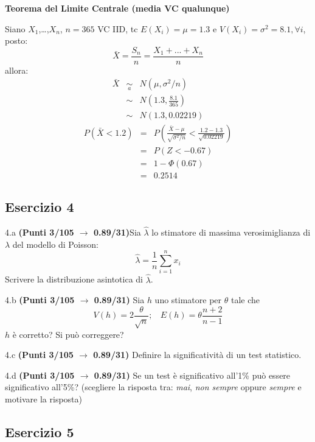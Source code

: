 \documentclass[
  11pt,
]{book}
\theoremstyle{mytheoremstyle}
\theoremstyle{mydefstyle}
\newenvironment{sol}
  {
  \begin{tcolorbox}[enhanced,breakable,arc=0.1mm,boxrule=1pt,colback=white,colframe=iblue,
  title=\bf \fontfamily{lmss}\selectfont \hspace{.5 cm} Soluzione,drop fuzzy shadow]

}{
\end{tcolorbox}
  }
\begin{document}
\begin{sol}
\textbf{Teorema del Limite Centrale (media VC qualunque)}

Siano \(X_1\),\ldots,\(X_n\), \(n=365\) VC IID, tc \(E(X_i)=\mu=1.3\) e \(V(X_i)=\sigma^2=8.1,\forall i\), posto:
\[
      \bar X=\frac{S_n}n =\frac{X_1 + ... + X_n}n
      \]
allora:\begin{eqnarray*}
  \bar X & \mathop{\sim}\limits_{a}& N(\mu,\sigma^2/n) \\
     &\sim & N\left(1.3,\frac{8.1}{365}\right) \\
     &\sim & N(1.3,0.02219)
  \end{eqnarray*}\begin{eqnarray*}
      P( \bar X   <   1.2 ) 
        &=& P\left(  \frac { \bar X  -  \mu }{ \sqrt{\sigma^2/n} }  <  \frac { 1.2  -  1.3 }{\sqrt{ 0.02219 }} \right)  \\
                 &=& P\left(  Z   <   -0.67 \right) \\    
                 &=&  1-\Phi( 0.67 ) \\ &=&  0.2514 
      \end{eqnarray*}

\end{sol}

\subsection{Esercizio 4}\label{esercizio-4-29}

4.a \textbf{(Punti 3/105 \(\rightarrow\) 0.89/31)}Sia \(\hat \lambda\) lo stimatore di massima verosimiglianza di \(\lambda\) del modello di Poisson:
\[\hat\lambda =  \frac 1n\sum_{i=1}^nx_i\]
Scrivere la distribuzione asintotica di \(\hat \lambda\).

4.b \textbf{(Punti 3/105 \(\rightarrow\) 0.89/31)} Sia \(h\) uno stimatore per \(\theta\) tale che
\[V(h)=2\frac\theta {\sqrt{n}};~~~~E(h)=\theta\frac{n+2}{n-1}\]
\(h\) è corretto? Si può correggere?

4.c \textbf{(Punti 3/105 \(\rightarrow\) 0.89/31)} Definire la significatività di un test statistico.

4.d \textbf{(Punti 3/105 \(\rightarrow\) 0.89/31)} Se un test è significativo all'1\% può essere significativo all'5\%? (scegliere la risposta tra: \emph{mai}, \emph{non sempre} oppure \emph{sempre} e motivare la risposta)

\subsection{Esercizio 5}\label{esercizio-5-27}
\end{document}
